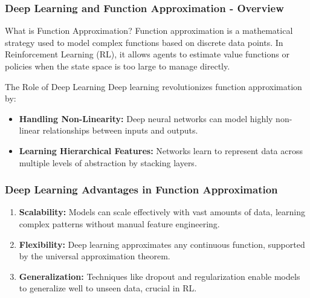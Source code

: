 \documentclass[aspectratio=169]{beamer}
\begin{document}
\begin{frame}[fragile]
    \frametitle{Deep Learning and Function Approximation - Overview}
    \begin{block}{What is Function Approximation?}
        Function approximation is a mathematical strategy used to model complex functions based on discrete data points. In Reinforcement Learning (RL), it allows agents to estimate value functions or policies when the state space is too large to manage directly.
    \end{block}
    
    \begin{block}{The Role of Deep Learning}
        Deep learning revolutionizes function approximation by:
        \begin{itemize}
            \item \textbf{Handling Non-Linearity:} Deep neural networks can model highly non-linear relationships between inputs and outputs.
            \item \textbf{Learning Hierarchical Features:} Networks learn to represent data across multiple levels of abstraction by stacking layers.
        \end{itemize}
    \end{block}
\end{frame}

\begin{frame}[fragile]
    \frametitle{Deep Learning Advantages in Function Approximation}
    \begin{enumerate}
        \item \textbf{Scalability:} Models can scale effectively with vast amounts of data, learning complex patterns without manual feature engineering.
        \item \textbf{Flexibility:} Deep learning approximates any continuous function, supported by the universal approximation theorem.
        \item \textbf{Generalization:} Techniques like dropout and regularization enable models to generalize well to unseen data, crucial in RL.
    \end{enumerate}
\end{frame}
\end{document}
